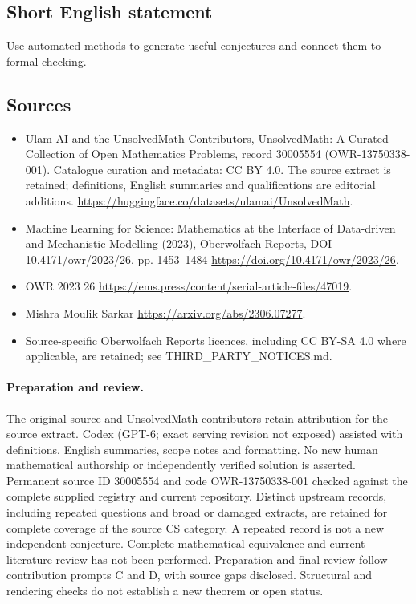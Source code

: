 \documentclass[11pt]{article}
\begin{document}
\subsection{Short English statement}
Use automated methods to generate useful conjectures and connect them to formal checking.
\subsection{Sources}
\begin{itemize}
\item[\hypertarget{source:30005554:1}{S1}] Ulam AI and the UnsolvedMath Contributors, UnsolvedMath: A Curated Collection of Open Mathematics Problems, record 30005554 (OWR-13750338-001). Catalogue curation and metadata: CC BY 4.0. The source extract is retained; definitions, English summaries and qualifications are editorial additions.
\url{https://huggingface.co/datasets/ulamai/UnsolvedMath}.
\item[\hypertarget{source:30005554:2}{S2}] Machine Learning for Science: Mathematics at the Interface of Data-driven and Mechanistic Modelling (2023), Oberwolfach Reports, DOI 10.4171/owr/2023/26, pp. 1453--1484
\url{https://doi.org/10.4171/owr/2023/26}.
\item[\hypertarget{source:30005554:3}{S3}] OWR 2023 26
\url{https://ems.press/content/serial-article-files/47019}.
\item[\hypertarget{source:30005554:4}{S4}] Mishra Moulik Sarkar
\url{https://arxiv.org/abs/2306.07277}.
\item Source-specific Oberwolfach Reports licences, including CC BY-SA 4.0 where applicable, are retained; see THIRD\_PARTY\_NOTICES.md.
\end{itemize}
\paragraph{Preparation and review.}
The original source and UnsolvedMath contributors retain attribution for the source extract. Codex (GPT-6; exact serving revision not exposed) assisted with definitions, English summaries, scope notes and formatting. No new human mathematical authorship or independently verified solution is asserted. Permanent source ID 30005554 and code OWR-13750338-001 checked against the complete supplied registry and current repository. Distinct upstream records, including repeated questions and broad or damaged extracts, are retained for complete coverage of the source CS category. A repeated record is not a new independent conjecture. Complete mathematical-equivalence and current-literature review has not been performed. Preparation and final review follow contribution prompts C and D, with source gaps disclosed. Structural and rendering checks do not establish a new theorem or open status.
\label{end:30005554}
\end{document}
